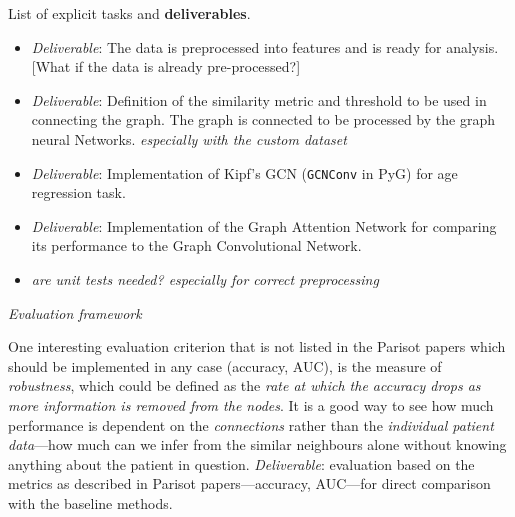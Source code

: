 \documentclass[12pt,a4paper,twoside]{article}
\begin{document}
List of explicit tasks and \textbf{deliverables}.
\begin{itemize}
  \item \textit{Deliverable}: The data is preprocessed into features and is ready for analysis. [What if the data is already pre-processed?] %
  \item \textit{Deliverable}: Definition of the similarity metric and threshold to be used in connecting the graph. The graph is connected to be processed by the graph neural Networks. \textit{especially with the custom dataset}
  \item \textit{Deliverable}: Implementation of Kipf's GCN \cite{kipf2017semi} (\texttt{GCNConv} in PyG) for age regression task.
  \item \textit{Deliverable}: Implementation of the Graph Attention Network for comparing its performance to the Graph Convolutional Network.
  \item \textit{are unit tests needed? especially for correct preprocessing}
\end{itemize}

\textit{Evaluation framework}

One interesting evaluation criterion that is not listed in the Parisot papers which should be implemented in any case (accuracy, AUC), is the measure of \textit{robustness}, which could be defined as the \textit{rate at which the accuracy drops as more information is removed from the nodes}. It is a good way to see how much performance is dependent on the \textit{connections} rather than the \textit{individual patient data}—how much can we infer from the similar neighbours alone without knowing anything about the patient in question. \textit{Deliverable}: evaluation based on the metrics as described in Parisot papers—accuracy, AUC—for direct comparison with the baseline methods.
\end{document}
